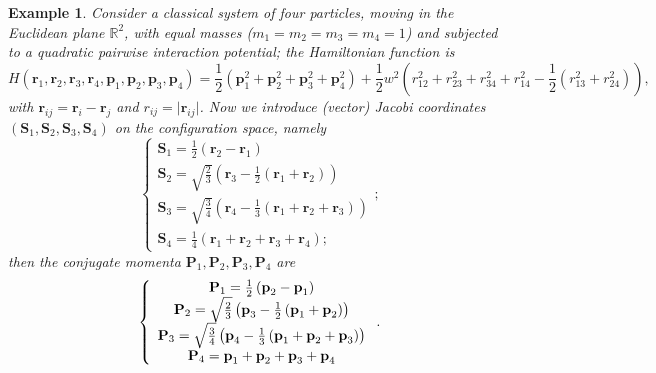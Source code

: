 \documentclass[10pt,a4paper]{article}
\newtheorem{example}{Example}
\begin{document}
\begin{example}
\label{exfourbody}
 Consider a classical system of four particles, moving in the Euclidean plane $\mathbb{R}^{2}$, with equal masses ($m_1 = m_2 = m_3 = m_4 = 1$) and subjected to a quadratic pairwise interaction potential; the Hamiltonian function is \cite{escobar2025four}
\begin{equation*}
H(\textbf{r}_{1},\textbf{r}_{2},\textbf{r}_{3},\textbf{r}_{4},\textbf{p}_{1},\textbf{p}_{2},\textbf{p}_{3},\textbf{p}_{4})=\frac{1}{2}\left(\textbf{p}_{1}^{2}+\textbf{p}_{2}^{2}+\textbf{p}_{3}^{2}+\textbf{p}_{4}^{2}\right)+\frac{1}{2}w^{2}\left(r_{12}^{2}+r_{23}^{2}+r_{34}^{2}+r_{14}^{2}-\frac{1}{2}\left(r_{13}^{2}+r_{24}^{2}\right)\right),
\end{equation*}
with $\textbf{r}_{ij}=\textbf{r}_{i}-\textbf{r}_{j}$ and $r_{ij}=\vert \textbf{r}_{ij}\vert$.
Now we introduce (vector) Jacobi coordinates $(\textbf{S}_{1},\textbf{S}_{2},\textbf{S}_{3},\textbf{S}_{4})$ on the configuration space, namely
\begin{equation*}
\left\lbrace \begin{array}{c}
\textbf{S}_{1}=\frac{1}{2}\left(\textbf{r}_{2}-\textbf{r}_{1}\right)\\
\textbf{S}_{2}=\sqrt{\frac{2}{3}}\left(\textbf{r}_{3}-\frac{1}{2}\left(\textbf{r}_{1}+\textbf{r}_{2}\right)\right)\\
\textbf{S}_{3}=\sqrt{\frac{3}{4}}\left(\textbf{r}_{4}-\frac{1}{3}\left(\textbf{r}_{1}+\textbf{r}_{2}+\textbf{r}_{3}\right)\right)\\
\textbf{S}_{4}=\frac{1}{4}\left(\textbf{r}_{1}+\textbf{r}_{2}+\textbf{r}_{3}+\textbf{r}_{4}\right);
\end{array} \right.;
\end{equation*}
then the conjugate momenta $\textbf{P}_{1},\textbf{P}_{2},\textbf{P}_{3},\textbf{P}_{4}$ are
\begin{equation*}
\left\lbrace \begin{array}{c}
\textbf{P}_{1}=\frac{1}{2}\left(\textbf{p}_{2}-\textbf{p}_{1}\right)\\
\textbf{P}_{2}=\sqrt{\frac{2}{3}}\left(\textbf{p}_{3}-\frac{1}{2}\left(\textbf{p}_{1}+\textbf{p}_{2}\right)\right)\\
\textbf{P}_{3}=\sqrt{\frac{3}{4}}\left(\textbf{p}_{4}-\frac{1}{3}\left(\textbf{p}_{1}+\textbf{p}_{2}+\textbf{p}_{3}\right)\right)\\
\textbf{P}_{4}=\textbf{p}_{1}+\textbf{p}_{2}+\textbf{p}_{3}+\textbf{p}_{4}
\end{array} \right. \\.
\end{equation*}


\end{example}
\end{document}
